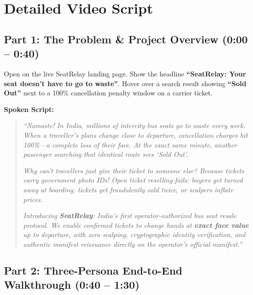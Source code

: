 \documentclass[11pt,a4paper]{article}
\begin{document}
\vspace{0.6em}

\section*{Detailed Video Script}

\subsection*{Part 1: The Problem \& Project Overview (0:00 -- 0:40)}

\begin{visualcue}
Open on the live SeatRelay landing page. Show the headline \textbf{``SeatRelay: Your seat doesn't have to go to waste''}. Hover over a search result showing \textbf{``Sold Out''} next to a 100\% cancellation penalty window on a carrier ticket.
\end{visualcue}

\noindent\textbf{Spoken Script:}
\begin{quote}
\textit{``Namaste! In India, millions of intercity bus seats go to waste every week. When a traveller's plans change close to departure, cancellation charges hit 100\%---a complete loss of their fare. At the exact same minute, another passenger searching that identical route sees `Sold Out'.}

\textit{Why can't travellers just give their ticket to someone else? Because tickets carry government photo IDs! Open ticket reselling fails: buyers get turned away at boarding, tickets get fraudulently sold twice, or scalpers inflate prices.}

\textit{Introducing \textbf{SeatRelay}: India's first operator-authorized bus seat resale protocol. We enable confirmed tickets to change hands at \textbf{exact face value} up to departure, with zero scalping, cryptographic identity verification, and authentic manifest reissuance directly on the operator's official manifest.''}
\end{quote}

\vspace{0.4em}

\subsection*{Part 2: Three-Persona End-to-End Walkthrough (0:40 -- 1:30)}
\end{document}
